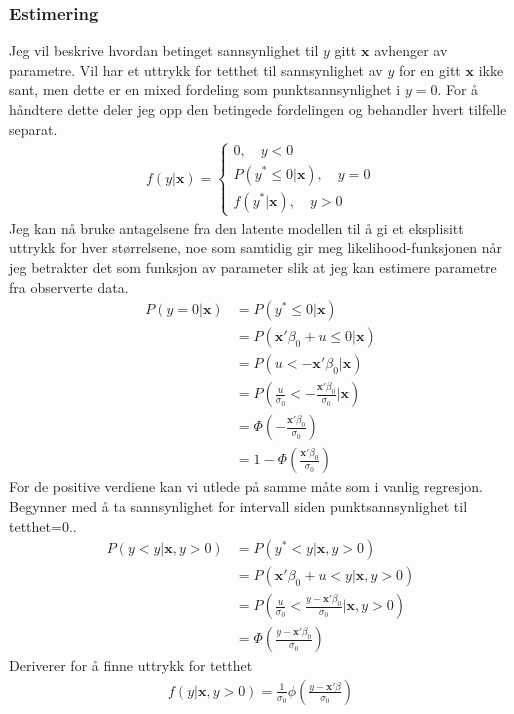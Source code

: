 \subsubsection{Estimering}
Jeg vil beskrive hvordan betinget sannsynlighet til $y$ gitt $\mathbf{x}$ avhenger av parametre. Vil har et uttrykk for tetthet til sannsynlighet av $y$ for en gitt $\mathbf{x}$ ikke sant, men dette er en mixed fordeling som punktsannsynlighet i $y=0$. For å håndtere dette deler jeg opp den betingede fordelingen og behandler hvert tilfelle separat.
\begin{align}
f(y|\mathbf{x}) = 
\begin{cases}
0,\quad y<0 \\
P(y^*\leq 0|\mathbf{x}),\quad y=0 \\
f(y^*|\mathbf{x}),\quad y>0
\end{cases}
\end{align}
Jeg kan nå bruke antagelsene fra den latente modellen til å gi et eksplisitt uttrykk for hver størrelsene, noe som samtidig gir meg likelihood-funksjonen når jeg betrakter det som funksjon av parameter slik at jeg kan estimere parametre fra observerte data.
\begin{align}
P(y=0|\mathbf{x}) &= P(y^*\leq0|\mathbf{x}) \\ 
&= P(\mathbf{x}'\beta_0+u\leq 0|\mathbf{x}) \\
&= P(u<-\mathbf{x}'\beta_0|\mathbf{x}) \\
&= P\left(\frac{u}{\sigma_0}<-\frac{\mathbf{x}'\beta_0}{\sigma_0}|\mathbf{x}\right) \\
&= \Phi\left(-\frac{\mathbf{x}'\beta_0}{\sigma_0}\right) \\
&= 1-\Phi\left(\frac{\mathbf{x}'\beta_0}{\sigma_0}\right)
\end{align}
For de positive verdiene kan vi utlede på samme måte som i vanlig regresjon. Begynner med å ta sannsynlighet for intervall siden punktsannsynlighet til tetthet=0..
\begin{align}
P(y<y|\mathbf{x},y>0) &= P(y^*<y|\mathbf{x},y>0)\\
&=P(\mathbf{x}'\beta_0+u<y|\mathbf{x},y>0) \\
&=P\left(\frac{u}{\sigma_0}<\frac{y-\mathbf{x}'\beta_0}{\sigma_0}|\mathbf{x},y>0\right) \\
&= \Phi\left(\frac{y-\mathbf{x}'\beta_0}{\sigma_0}\right)
\end{align}
Deriverer for å finne uttrykk for tetthet
\begin{align}
f(y|\mathbf{x},y>0) = \frac{1}{\sigma_0}\phi\left(\frac{y-\mathbf{x}'\beta}{\sigma_0}\right)
\end{align}
